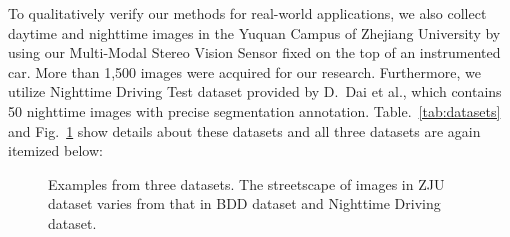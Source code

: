 \documentclass[a4paper]{spie}
\begin{document}
To qualitatively verify our methods for real-world applications, we also collect daytime and nighttime images in the Yuquan Campus of Zhejiang University by using our Multi-Modal Stereo Vision Sensor\cite{sun2019multi} fixed on the top of an instrumented car. More than 1,500 images were acquired for our research. Furthermore, we utilize Nighttime Driving Test dataset provided by D.~Dai et al.\cite{dai2018dark}, which contains 50 nighttime images with precise segmentation annotation. Table.~\ref{tab:datasets} and Fig.~\ref{fig:datasets} show details about these datasets and all three datasets are again itemized below:

\begin{figure}[ht]
   \centering
   \hspace{-1pt}  \hspace{-1pt}
   \hspace{-1pt}
   \caption[datasets]
   { \label{fig:datasets}
   Examples from three datasets. The streetscape of images in ZJU dataset varies from that in BDD dataset and Nighttime Driving dataset.}
\end{figure}
\end{document}
